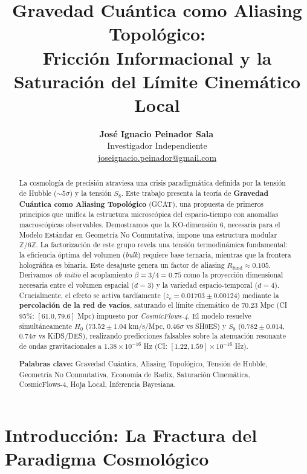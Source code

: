 \documentclass[12pt, a4paper]{article}
\title{\textbf{Gravedad Cuántica como Aliasing Topológico:} \\ Fricción Informacional y la Saturación del Límite Cinemático Local}
\author{
  \textbf{José Ignacio Peinador Sala}\,\orcidlink{0009-0008-1822-3452} \\
  Investigador Independiente \\[2pt]
  \small\href{mailto:joseignacio.peinador@gmail.com}{joseignacio.peinador@gmail.com}
}
\date{}
\theoremstyle{plain}
\theoremstyle{definition}
\begin{document}
\maketitle

\begin{abstract}
\noindent
La cosmología de precisión atraviesa una crisis paradigmática definida por la tensión de Hubble ($\sim 5\sigma$) y la tensión $S_8$. Este trabajo presenta la teoría de \textbf{Gravedad Cuántica como Aliasing Topológico} (GCAT), una propuesta de primeros principios que unifica la estructura microscópica del espacio-tiempo con anomalías macroscópicas observables. Demostramos que la KO-dimensión 6, necesaria para el Modelo Estándar en Geometría No Conmutativa, impone una estructura modular $\mathbb{Z}/6\mathbb{Z}$. La factorización de este grupo revela una tensión termodinámica fundamental: la eficiencia óptima del volumen (\textit{bulk}) requiere base ternaria, mientras que la frontera holográfica es binaria. Este desajuste genera un factor de aliasing $R_{\text{fund}} \approx 0.105$. Derivamos \textit{ab initio} el acoplamiento $\beta = 3/4 = 0.75$ como la proyección dimensional necesaria entre el volumen espacial ($d=3$) y la variedad espacio-temporal ($d=4$). Crucialmente, el efecto se activa tardíamente ($z_c = 0.01703 \pm 0.00124$) mediante la \textbf{percolación de la red de vacíos}, saturando el límite cinemático de $70.23$ Mpc (CI 95\%: $[61.0, 79.6]$ Mpc) impuesto por \textit{CosmicFlows-4}. El modelo resuelve simultáneamente $H_0$ ($73.52 \pm 1.04$ km/s/Mpc, $0.46\sigma$ vs SH0ES) y $S_8$ ($0.782 \pm 0.014$, $0.74\sigma$ vs KiDS/DES), realizando predicciones falsables sobre la atenuación resonante de ondas gravitacionales a $1.38 \times 10^{-16}$ Hz (CI: $[1.22, 1.59] \times 10^{-16}$ Hz).

\vspace{0.5cm}
\noindent \textbf{Palabras clave:} Gravedad Cuántica, Aliasing Topológico, Tensión de Hubble, Geometría No Conmutativa, Economía de Radix, Saturación Cinemática, CosmicFlows-4, Hoja Local, Inferencia Bayesiana.
\end{abstract}

\section{Introducción: La Fractura del Paradigma Cosmológico}
\label{sec:introduccion}
\end{document}
